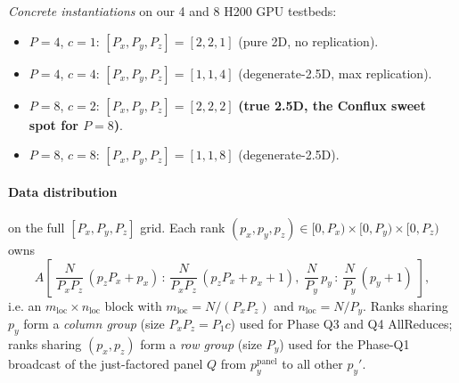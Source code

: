 \documentclass[11pt]{article}
\begin{document}
\emph{Concrete instantiations} on our 4 and 8 H200 GPU testbeds:
\begin{itemize}[leftmargin=2em, itemsep=0.2em]
  \item $P=4$, $c=1$: $[P_x, P_y, P_z] = [2, 2, 1]$ (pure 2D, no replication).
  \item $P=4$, $c=4$: $[P_x, P_y, P_z] = [1, 1, 4]$ (degenerate-2.5D, max replication).
  \item $P=8$, $c=2$: $[P_x, P_y, P_z] = [2, 2, 2]$ \textbf{(true 2.5D, the
        Conflux sweet spot for $P=8$)}.
  \item $P=8$, $c=8$: $[P_x, P_y, P_z] = [1, 1, 8]$ (degenerate-2.5D).
\end{itemize}

\paragraph{Data distribution} on the full $[P_x, P_y, P_z]$ grid.  Each rank
$(p_x, p_y, p_z) \in [0, P_x) \times [0, P_y) \times [0, P_z)$ owns
\[
A\!\left[\;
\frac{N}{P_x P_z}\,(p_z P_x + p_x) \,:\, \frac{N}{P_x P_z}\,(p_z P_x + p_x + 1),\;
\frac{N}{P_y}\,p_y \,:\, \frac{N}{P_y}\,(p_y + 1)
\;\right],
\]
i.e. an $m_{\mathrm{loc}} \times n_{\mathrm{loc}}$ block with
$m_{\mathrm{loc}} = N/(P_x P_z)$ and $n_{\mathrm{loc}} = N/P_y$.  Ranks
sharing $p_y$ form a \emph{column group} (size $P_x P_z = P_1 c$) used for
Phase Q3 and Q4 AllReduces; ranks sharing $(p_x, p_z)$ form a
\emph{row group} (size $P_y$) used for the Phase-Q1 broadcast of the
just-factored panel $Q$ from $p_y^{\text{panel}}$ to all other $p_y'$.
\end{document}
